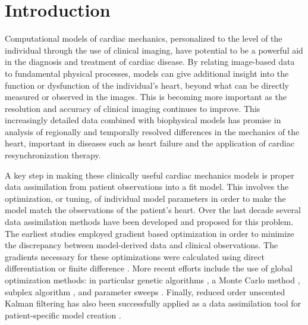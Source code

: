 
\clearpage
\section{Introduction}
Computational models of cardiac mechanics, personalized to the level of the individual 
through the use of clinical imaging, have potential to be a powerful aid in the diagnosis and 
treatment of cardiac disease.  By relating image-based data to fundamental physical 
processes, models can give additional insight into the function or dysfunction of the 
individual's heart, beyond what can be directly measured or observed in the images. 
This is becoming more important as the resolution and accuracy of clinical imaging continues to 
improve.  This increasingly detailed data combined with biophysical models has promise 
in analysis of regionally and temporally resolved differences in the mechanics of the heart, 
important in diseases such as heart failure and the application of cardiac resynchronization therapy. 

A key step in making these clinically useful cardiac mechanics models is proper data assimilation from patient observations into a fit model. This involves the optimization, or tuning, of individual model parameters in order to make the model match the observations of the patient's heart.  Over the last decade several data assimilation methods have been developed and proposed for this problem. The earliest studies employed gradient based optimization in order to minimize the discrepancy between model-derived data and clinical observations.  The gradients necessary for these optimizations were calculated using direct differentiation \cite{sermesant2006cardiac}
or finite difference \cite{augenstein2005method, gao2015parameter, Wang2009}.
More recent efforts include the use of global optimization methods:
in particular genetic algorithms \cite{mojsejenko2014estimating,
sun2009computationally}, a Monte Carlo method \cite{neumann2014robust},
subplex algorithm \cite{wong2015velocity}, and parameter sweeps \cite{asner2015estimation, hadjicharalambous2015analysis}.
Finally, reduced order unscented Kalman filtering has also been successfully applied as
a data assimilation tool for patient-specific model creation \cite{chabiniok2012estimation,
xi2011myocardial, Marchesseau2013}.

